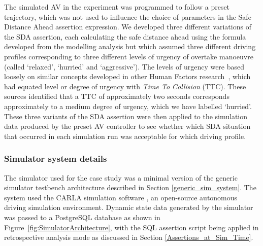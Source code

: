 
The simulated AV in the experiment was programmed to follow a preset trajectory, which was not used to influence the choice of parameters in the Safe Distance Ahead assertion expression. We developed three different variations of the SDA assertion, each calculating the safe distance ahead using the formula developed from the modelling analysis %
but which assumed three different driving profiles corresponding to three different levels of urgency of overtake manoeuvre (called `relaxed', `hurried' and `aggressive'). The levels of urgency were based loosely on similar concepts developed in other Human Factors research~\cite{Chen2015,wang2019analysis}, which had equated level or degree of urgency with \emph{Time To Collision} (TTC). These sources identified that a TTC of approximately two seconds corresponds approximately to a medium degree of urgency, which we have labelled `hurried'. These three variants of the SDA assertion were then applied to the simulation data produced by the preset AV controller to see whether which SDA situation that occurred in each simulation run was acceptable for which driving profile.

\subsubsection{Simulator system details}

The simulator used for the case study was a minimal version of the generic simulator testbench architecture described in Section \ref{generic_sim_system}. The system used the CARLA simulation software \cite{CarlaSimulator}, an open-source autonomous driving simulation environment. Dynamic state data generated by the simulator was passed to a PostgreSQL database as shown in Figure~\ref{fig:SimulatorArchitecture}, with the SQL assertion script being applied in retrospective analysis mode as discussed in Section \ref{Assertions_at_Sim_Time}.

